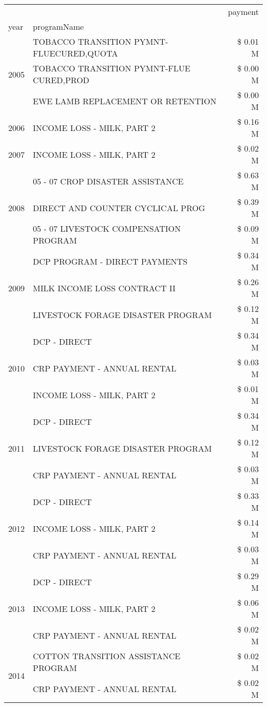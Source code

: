 \begin{tabular}{llr}
\toprule
 &  & payment \\
year & programName &  \\
\midrule
\multirow[t]{3}{*}{2005} & TOBACCO TRANSITION PYMNT-FLUECURED,QUOTA & \$ 0.01 M \\
 & TOBACCO TRANSITION PYMNT-FLUE CURED,PROD & \$ 0.00 M \\
 & EWE LAMB REPLACEMENT OR RETENTION & \$ 0.00 M \\
\cline{1-3}
2006 & INCOME LOSS - MILK, PART 2 & \$ 0.16 M \\
\cline{1-3}
2007 & INCOME LOSS - MILK, PART 2 & \$ 0.02 M \\
\cline{1-3}
\multirow[t]{3}{*}{2008} & 05 - 07 CROP DISASTER ASSISTANCE & \$ 0.63 M \\
 & DIRECT AND COUNTER CYCLICAL PROG & \$ 0.39 M \\
 & 05 - 07 LIVESTOCK COMPENSATION PROGRAM & \$ 0.09 M \\
\cline{1-3}
\multirow[t]{3}{*}{2009} & DCP PROGRAM - DIRECT PAYMENTS & \$ 0.34 M \\
 & MILK INCOME LOSS CONTRACT II & \$ 0.26 M \\
 & LIVESTOCK FORAGE DISASTER  PROGRAM & \$ 0.12 M \\
\cline{1-3}
\multirow[t]{3}{*}{2010} & DCP - DIRECT & \$ 0.34 M \\
 & CRP PAYMENT - ANNUAL RENTAL & \$ 0.03 M \\
 & INCOME LOSS - MILK, PART 2 & \$ 0.01 M \\
\cline{1-3}
\multirow[t]{3}{*}{2011} & DCP - DIRECT & \$ 0.34 M \\
 & LIVESTOCK FORAGE DISASTER PROGRAM & \$ 0.12 M \\
 & CRP PAYMENT - ANNUAL RENTAL & \$ 0.03 M \\
\cline{1-3}
\multirow[t]{3}{*}{2012} & DCP - DIRECT & \$ 0.33 M \\
 & INCOME LOSS - MILK, PART 2 & \$ 0.14 M \\
 & CRP PAYMENT - ANNUAL RENTAL & \$ 0.03 M \\
\cline{1-3}
\multirow[t]{3}{*}{2013} & DCP - DIRECT & \$ 0.29 M \\
 & INCOME LOSS - MILK, PART 2 & \$ 0.06 M \\
 & CRP PAYMENT - ANNUAL RENTAL & \$ 0.02 M \\
\cline{1-3}
\multirow[t]{3}{*}{2014} & COTTON TRANSITION ASSISTANCE PROGRAM & \$ 0.02 M \\
 & CRP PAYMENT - ANNUAL RENTAL & \$ 0.02 M \\

\end{tabular}
